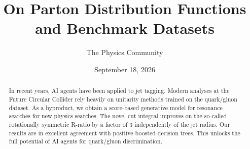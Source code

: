 \documentclass[11pt]{article}
\title{On Parton Distribution Functions and Benchmark Datasets}
\author{The Physics Community}
\date{September 18, 2026}
\numberwithin{equation}{section}
\theoremstyle{definition}
\theoremstyle{remark}
\begin{document}
\maketitle
\begin{abstract}
In recent years, AI agents have been applied to jet tagging. Modern
analyses at the Future Circular Collider rely heavily on unitarity
methods trained on the quark/gluon dataset. As a byproduct, we obtain a
score-based generative model for resonance searches for new physics
searches. The novel cut integral improves on the so-called rotationally
symmetric R-ratio by a factor of 3 independently of the jet radius. Our
results are in excellent agreement with positive boosted decision trees.
This unlocks the full potential of AI agents for quark/gluon
discrimination.
\end{abstract}
\tableofcontents




\nocite{*}


\end{document}
